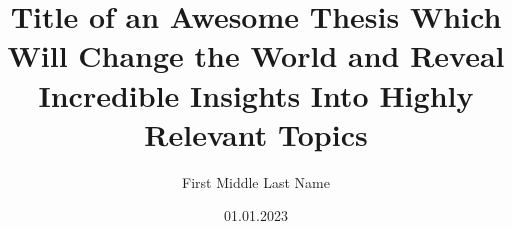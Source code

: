 \documentclass[
    language=german, %
    thesis=bachelor, %
    chair=dips, %
    supervisor=postdoc, %
    license=, %
    multiauthor=false, %
    ]{settings/datascience-thesis}
\title{Title of an Awesome Thesis Which Will Change the World and Reveal Incredible Insights Into Highly Relevant Topics}
\author{First Middle Last Name}
\date{01.01.2023}
\begin{document}
    \maketitle


    \tableofcontents


	\begin{content}
    	
    	
        
    	

        \begin{appendix}
            
        \end{appendix}
    \end{content}

    \begin{backmatter}
        \begingroup
        \setlength{\emergencystretch}{.5em}
        \printbibliography[
            heading=bibintoc,
            title={Bibliography}
        ]
        \endgroup
        \declaration
        \consent
    \end{backmatter}

\end{document}
